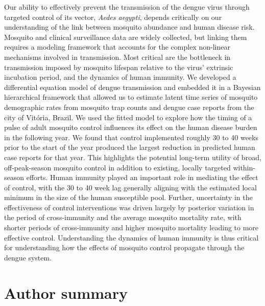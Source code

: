\documentclass[10pt,letterpaper]{article}
\begin{document}
Our ability to effectively prevent the transmission of the dengue virus through targeted control of its vector, \emph{Aedes aegypti}, depends critically on our understanding of the link between mosquito abundance and human disease risk.
Mosquito and clinical surveillance data are widely collected, but linking them requires a modeling framework that accounts for the complex non-linear mechanisms involved in transmission.
Most critical are the bottleneck in transmission imposed by mosquito lifespan relative to the virus' extrinsic incubation period, and the dynamics of human immunity.
We developed a differential equation model of dengue transmission and embedded it in a Bayesian hierarchical framework that allowed us to estimate latent time series of mosquito demographic rates from mosquito trap counts and dengue case reports from the city of Vit\'oria, Brazil.
We used the fitted model to explore how the timing of a pulse of adult mosquito control influences its effect on the human disease burden in the following year.
We found that control implemented roughly 30 to 40 weeks prior to the start of the year produced the largest reduction in predicted human case reports for that year.
This highlights the potential long-term utility of broad, off-peak-season mosquito control in addition to existing, locally targeted within-season efforts.
Human immunity played an important role in mediating the effect of control, with the 30 to 40 week lag generally aligning with the estimated local minimum in the size of the human susceptible pool.
Further, uncertainty in the effectiveness of control interventions was driven largely by posterior variation in the period of cross-immunity and the average mosquito mortality rate, with shorter periods of cross-immunity and higher mosquito mortality leading to more effective control.
Understanding the dynamics of human immunity is thus critical for understanding how the effects of mosquito control propagate through the dengue system.

\section*{Author summary}
\end{document}
